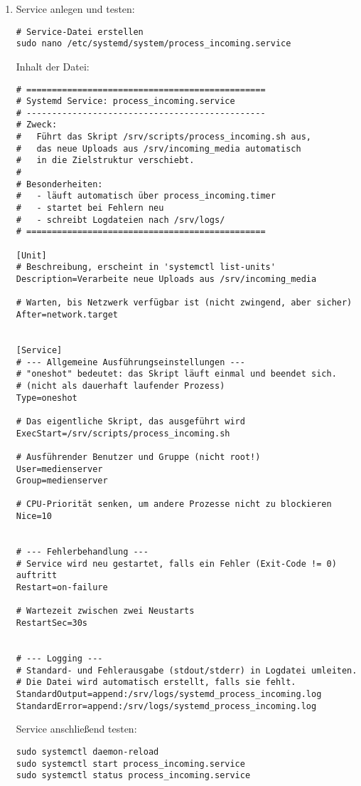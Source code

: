 \documentclass[12pt,a4paper]{report}
\begin{document}
  \begin{enumerate}
    \item Service anlegen und testen:
    \begin{verbatim}
# Service-Datei erstellen
sudo nano /etc/systemd/system/process_incoming.service
    \end{verbatim}

    Inhalt der Datei:
    \begin{verbatim}
# ===============================================
# Systemd Service: process_incoming.service
# -----------------------------------------------
# Zweck:
#   Führt das Skript /srv/scripts/process_incoming.sh aus,
#   das neue Uploads aus /srv/incoming_media automatisch
#   in die Zielstruktur verschiebt.
#
# Besonderheiten:
#   - läuft automatisch über process_incoming.timer
#   - startet bei Fehlern neu
#   - schreibt Logdateien nach /srv/logs/
# ===============================================

[Unit]
# Beschreibung, erscheint in 'systemctl list-units'
Description=Verarbeite neue Uploads aus /srv/incoming_media

# Warten, bis Netzwerk verfügbar ist (nicht zwingend, aber sicher)
After=network.target


[Service]
# --- Allgemeine Ausführungseinstellungen ---
# "oneshot" bedeutet: das Skript läuft einmal und beendet sich.
# (nicht als dauerhaft laufender Prozess)
Type=oneshot

# Das eigentliche Skript, das ausgeführt wird
ExecStart=/srv/scripts/process_incoming.sh

# Ausführender Benutzer und Gruppe (nicht root!)
User=medienserver
Group=medienserver

# CPU-Priorität senken, um andere Prozesse nicht zu blockieren
Nice=10


# --- Fehlerbehandlung ---
# Service wird neu gestartet, falls ein Fehler (Exit-Code != 0) auftritt
Restart=on-failure

# Wartezeit zwischen zwei Neustarts
RestartSec=30s


# --- Logging ---
# Standard- und Fehlerausgabe (stdout/stderr) in Logdatei umleiten.
# Die Datei wird automatisch erstellt, falls sie fehlt.
StandardOutput=append:/srv/logs/systemd_process_incoming.log
StandardError=append:/srv/logs/systemd_process_incoming.log
    \end{verbatim}

    \noindent Service anschließend testen:
    \begin{verbatim}
sudo systemctl daemon-reload
sudo systemctl start process_incoming.service
sudo systemctl status process_incoming.service
    \end{verbatim}


\end{enumerate}
\end{document}
